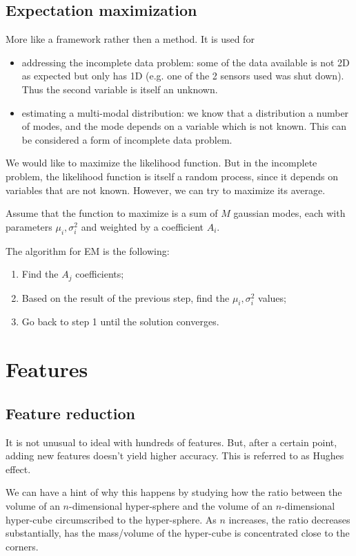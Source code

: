 \documentclass[oneside,onecolumn]{report}
\begin{document}
\section{Expectation maximization}
More like a framework rather then a method.
It is used for
\begin{itemize}
    \item addressing the incomplete data problem: some of the data available is not 2D as expected but only has 1D (e.g. one of the 2 sensors used was shut down). Thus the second variable is itself an unknown.
    \item estimating a multi-modal distribution: we know that a distribution a number of modes, and the mode depends on a variable which is not known. This can be considered a form of incomplete data problem.
\end{itemize}

We would like to maximize the likelihood function.
But in the incomplete problem, the likelihood function is itself a random process, since it depends on variables that are not known.
However, we can try to maximize its average.

Assume that the function to maximize is a sum of $M$ gaussian modes, each with parameters $\mu_i, \sigma_i^2$ and weighted by a coefficient $A_i$.

The algorithm for EM is the following:
\begin{enumerate}
    \item Find the $A_j$ coefficients;
    \item Based on the result of the previous step, find the $\mu_i, \sigma_i^2$ values;
    \item Go back to step 1 until the solution converges.
\end{enumerate}


\clearpage
\chapter{Features}
\section{Feature reduction}
It is not unusual to ideal with hundreds of features.
But, after a certain point, adding new features doesn't yield higher accuracy.
This is referred to as Hughes effect.

We can have a hint of why this happens by studying how the ratio between the volume of an $n$-dimensional hyper-sphere and the volume of an $n$-dimensional hyper-cube circumscribed to the hyper-sphere.
As $n$ increases, the ratio decreases substantially, has the mass/volume of the hyper-cube is concentrated close to the corners.
\end{document}
